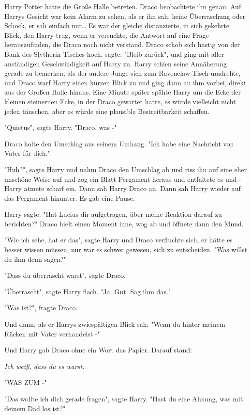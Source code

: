 {Harry Potter hatte die Große Halle betreten. Draco beobachtete ihn genau. Auf Harrys Gesicht war kein Alarm zu sehen, als er ihn sah, keine Überraschung oder Schock, er sah einfach nur… Es war der gleiche distanzierte, in sich gekehrte Blick, den Harry trug, wenn er versuchte, die Antwort auf eine Frage herauszufinden, die Draco noch nicht verstand. Draco schob sich hastig von der Bank des Slytherin-Tisches hoch, sagte: "Bleib zurück", und ging mit aller anständigen Geschwindigkeit auf Harry zu. Harry schien seine Annäherung gerade zu bemerken, als der andere Junge sich zum Ravenclaw-Tisch umdrehte, und Draco warf Harry einen kurzen Blick zu und ging dann an ihm vorbei, direkt aus der Großen Halle hinaus. Eine Minute später spähte Harry um die Ecke der kleinen steinernen Ecke, in der Draco gewartet hatte, es würde vielleicht nicht jeden täuschen, aber es würde eine plausible Bestreitbarkeit schaffen.

"Quietus", sagte Harry. "Draco, was -"

Draco holte den Umschlag aus seinem Umhang. "Ich habe eine Nachricht von Vater für dich."

"Huh?", sagte Harry und nahm Draco den Umschlag ab und riss ihn auf eine eher unschöne Weise auf und zog ein Blatt Pergament heraus und entfaltete es und - Harry atmete scharf ein. Dann sah Harry Draco an. Dann sah Harry wieder auf das Pergament hinunter. Es gab eine Pause.

Harry sagte: "Hat Lucius dir aufgetragen, über meine Reaktion darauf zu berichten?" Draco hielt einen Moment inne, wog ab und öffnete dann den Mund.

"Wie ich sehe, hat er das", sagte Harry und Draco verfluchte sich, er hätte es besser wissen müssen, nur war es schwer gewesen, sich zu entscheiden. "Was willst du ihm denn sagen?"

"Dass du überrascht warst", sagte Draco.

"Überrascht", sagte Harry flach. "Ja. Gut. Sag ihm das."

"Was ist?", fragte Draco.

Und dann, als er Harrys zwiespältigen Blick sah: "Wenn du hinter meinem Rücken mit Vater verhandelst -"

Und Harry gab Draco ohne ein Wort das Papier. Darauf stand:

\emph{Ich weiß, dass du es warst.}

"WAS ZUM -"

"Das wollte ich dich gerade fragen", sagte Harry. "Hast du eine Ahnung, was mit deinem Dad los ist?"

}
